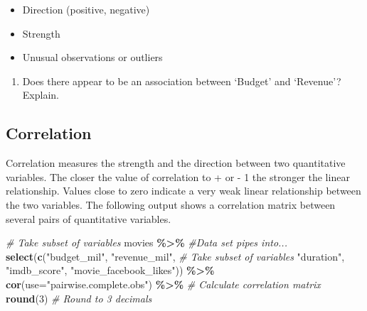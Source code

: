 \documentclass[
]{report}
\newenvironment{Shaded}{\begin{snugshade}}{\end{snugshade}}
\newcommand{\CommentTok}[1]{\textcolor[rgb]{0.56,0.35,0.01}{\textit{#1}}}
\newcommand{\DataTypeTok}[1]{\textcolor[rgb]{0.13,0.29,0.53}{#1}}
\newcommand{\DecValTok}[1]{\textcolor[rgb]{0.00,0.00,0.81}{#1}}
\newcommand{\KeywordTok}[1]{\textcolor[rgb]{0.13,0.29,0.53}{\textbf{#1}}}
\newcommand{\NormalTok}[1]{#1}
\newcommand{\OperatorTok}[1]{\textcolor[rgb]{0.81,0.36,0.00}{\textbf{#1}}}
\newcommand{\StringTok}[1]{\textcolor[rgb]{0.31,0.60,0.02}{#1}}
\providecommand{\tightlist}{%
  \setlength{\itemsep}{0pt}\setlength{\parskip}{0pt}}
\begin{document}
\begin{itemize}
\tightlist
\item
  Direction (positive, negative)
\end{itemize}

\vspace{.4in}

\begin{itemize}
\tightlist
\item
  Strength
\end{itemize}

\vspace{.4in}

\begin{itemize}
\tightlist
\item
  Unusual observations or outliers
\end{itemize}

\vspace{.4in}

\newpage

\begin{enumerate}
\def\labelenumi{\arabic{enumi}.}
\setcounter{enumi}{3}
\tightlist
\item
  Does there appear to be an association between `Budget' and `Revenue'? Explain.
\end{enumerate}

\vspace{1in}

\hypertarget{correlation}{%
\subsection*{Correlation}\label{correlation}}

Correlation measures the strength and the direction between two quantitative variables. The closer the value of correlation to + or - 1 the stronger the linear relationship. Values close to zero indicate a very weak linear relationship between the two variables. The following output shows a correlation matrix between several pairs of quantitative variables.

\begin{Shaded}
\begin{Highlighting}[]
\CommentTok{\# Take subset of variables}
\NormalTok{movies }\OperatorTok{\%\textgreater{}\%}\StringTok{  }\CommentTok{\#Data set pipes into...}
\StringTok{  }\KeywordTok{select}\NormalTok{(}\KeywordTok{c}\NormalTok{(}\StringTok{"budget\_mil"}\NormalTok{, }\StringTok{"revenue\_mil"}\NormalTok{,  }\CommentTok{\# Take subset of variables}
           \StringTok{"duration"}\NormalTok{, }\StringTok{"imdb\_score"}\NormalTok{, }
           \StringTok{"movie\_facebook\_likes"}\NormalTok{)) }\OperatorTok{\%\textgreater{}\%}
\StringTok{  }\KeywordTok{cor}\NormalTok{(}\DataTypeTok{use=}\StringTok{"pairwise.complete.obs"}\NormalTok{) }\OperatorTok{\%\textgreater{}\%}\StringTok{ }\CommentTok{\# Calculate correlation matrix}
\StringTok{  }\KeywordTok{round}\NormalTok{(}\DecValTok{3}\NormalTok{)  }\CommentTok{\# Round to 3 decimals}
\end{Highlighting}
\end{Shaded}
\end{document}
